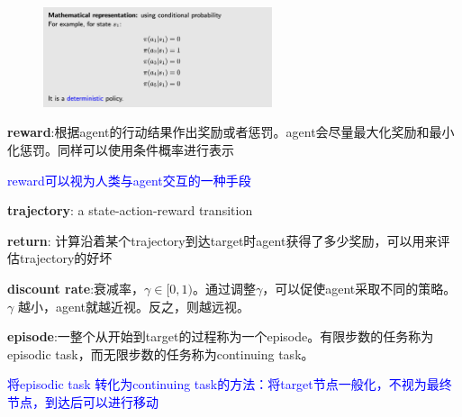 \documentclass{article}
\begin{document}
\begin{figure}[htbp]
    \center{}
    \includegraphics[width=0.6\textwidth]{picture3.png}
    \center{}
\end{figure}

\textbf{reward}:根据agent的行动结果作出奖励或者惩罚。agent会尽量最大化奖励和最小化惩罚。同样可以使用条件概率进行表示

\textcolor{blue}{\kaishu*reward可以视为人类与agent交互的一种手段}

\textbf{trajectory}: a state-action-reward transition

\textbf{return}: 计算沿着某个trajectory到达target时agent获得了多少奖励，可以用来评估trajectory的好坏

\textbf{discount rate}:衰减率，$\gamma \in [0, 1)$。通过调整$\gamma$，可以促使agent采取不同的策略。$\gamma$ 越小，agent就越近视。反之，则越远视。

\textbf{episode}:一整个从开始到target的过程称为一个episode。有限步数的任务称为episodic task，而无限步数的任务称为continuing task。

\textcolor{blue}{\kaishu*将episodic task 转化为continuing task的方法：将target节点一般化，不视为最终节点，到达后可以进行移动}
\end{document}
